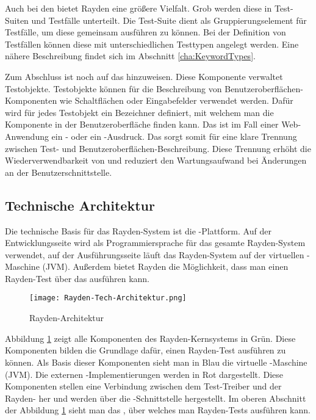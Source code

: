 \SuperPar
Auch bei den  bietet Rayden eine größere Vielfalt. Grob werden diese in Test-Suiten und Testfälle unterteilt. Die Test-Suite dient als Gruppierungselement für Testfälle, um diese gemeinsam ausführen zu können. Bei der Definition von Testfällen können diese mit unterschiedlichen Testtypen angelegt werden. Eine nähere Beschreibung findet sich im Abschnitt \ref{cha:KeywordTypes}.

\SuperPar
Zum Abschluss ist noch auf das  hinzuweisen. Diese Komponente verwaltet Testobjekte. Testobjekte können für die Beschreibung von Benutzeroberflächen-Komponenten wie Schaltflächen oder Eingabefelder verwendet werden. Dafür wird für jedes Testobjekt ein Bezeichner definiert, mit welchem man die Komponente in der Benutzeroberfläche finden kann. Das ist im Fall einer Web-Anwendung ein - oder ein -Ausdruck. Das  sorgt somit für eine klare Trennung zwischen Test- und Benutzeroberflächen-Beschreibung. Diese Trennung erhöht die Wiederverwendbarkeit von  und reduziert den Wartungsaufwand bei Änderungen an der Benutzerschnittstelle.

\subsection{Technische Architektur}
\label{cha:TechArch}

Die technische Basis für das Rayden-System ist die -Plattform. Auf der Entwicklungsseite wird  als Programmiersprache für das gesamte Rayden-System verwendet, auf der Ausführungsseite läuft das Rayden-System auf der virtuellen -Maschine (JVM). Außerdem bietet Rayden die Möglichkeit, dass man einen Rayden-Test über das  \cite{JavaScriptApi} ausführen kann. 

\begin{figure}[h]
\centering
\texttt{[image: Rayden-Tech-Architektur.png]}
\caption{Rayden-Architektur}
\label{fig:rayden-tech-arch}
\end{figure}

\SuperPar
Abbildung \ref{fig:rayden-tech-arch} zeigt alle Komponenten des Rayden-Kernsystems in Grün. Diese Komponenten bilden die Grundlage dafür, einen Rayden-Test ausführen zu können. Als Basis dieser Komponenten sieht man in Blau die virtuelle -Maschine (JVM). Die externen -Implementierungen werden in Rot dargestellt. Diese Komponenten stellen eine Verbindung zwischen dem Test-Treiber und der Rayden- her und werden über die -Schnittstelle hergestellt. Im oberen Abschnitt der Abbildung \ref{fig:rayden-tech-arch} sieht man das , über welches man Rayden-Tests ausführen kann.

